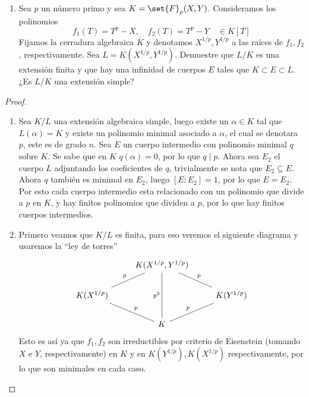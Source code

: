 \documentclass[11pt]{article}
\begin{document}
\begin{enumerate}[label=(\arabic*)]
\begin{enumerate}[label=(\alph*)]
            \item Sea $p$ un número primo y sea $K=\set{F}_p(X,Y)$. Consideramos los polinomios
            \[f_1(T)=T^p-X,\quad f_2(T)=T^p-Y\quad\in K[T]\]
            Fijamos la cerradura algebraica $\overline{K}$ y denotamos $X^{1/p},Y^{1/p}$ a las raíces de $f_1,f_2$, respectivamente. Sea $L=K(X^{1/p},Y^{1/p})$. Demuestre que $L/K$ es una extensión finita y que hay una infinidad de cuerpos $E$ tales que $K\subset E\subset L$. ¿Es $L/K$ una extensión simple?
        \end{enumerate}
        \begin{proof}
            \
            \begin{enumerate}[label=(\alph*)]
                \item Sea $K/L$ una extensión algebraica simple, luego existe un $\alpha\in K$ tal que $L(\alpha)=K$ y existe un polinomio minimal asociado a $\alpha$, el cual se denotara $p$, este es de grado $n$. Sea $E$ un cuerpo intermedio con polinomio minimal $q$ sobre $K$. Se sabe que en $K$ $q(\alpha)=0$, por lo que $q\mid p$. Ahora sea $E_2$ el cuerpo $L$ adjuntando los coeficientes de $q$, trivialmente se nota que $E_2\subseteq E$. Ahora $q$ también es minimal en $E_2$, luego $[E:E_2]=1$, por lo que $E=E_2$. Por esto cada cuerpo intermedio esta relacionado con un polinomio que divide a $p$ en $K$, y hay finitos polinomios que dividen a $p$, por lo que hay finitos cuerpos intermedios.

                \item Primero veamos que $K/L$ es finita, para eso veremos el siguiente diagrama y usaremos la ``ley de torres''
                \[
                    \begin{tikzcd}
                        & K(X^{1/p},Y^{1/p}) \arrow[no head]{dr}{p} \arrow[no head, swap]{dd}{p^2} \arrow[no head, swap]{dl}{p} &\\
                        K(X^{1/p}) \arrow[no head]{dr}{p} & & K({Y^{1/p}}) \arrow[no head, swap]{dl}{p}\\
                        & K &
                    \end{tikzcd}
                \]
                Esto es así ya que $f_1,f_2$ son irreductibles por criterio de Eisenstein (tomando $X$ e $Y$, respectivamente) en $K$ y en $K(Y^{1/p}),K(X^{1/p})$ respectivamente, por lo que son minimales en cada caso.


\end{enumerate}
\end{proof}
\end{enumerate}
\end{document}
